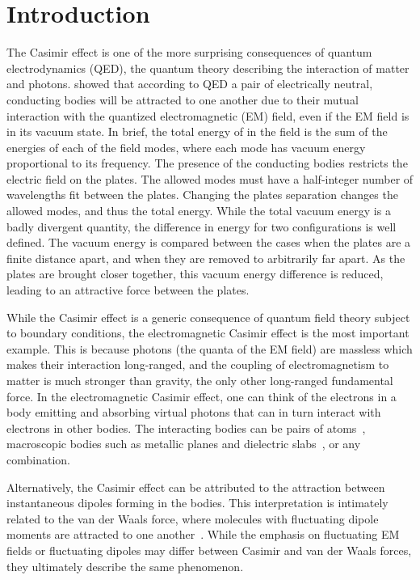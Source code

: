 \chapter{Introduction}
\label{ch:introduction}

The Casimir effect is one of the more surprising consequences of quantum electrodynamics (QED), the quantum theory
describing the interaction of matter and photons.
\citet{Casimir1948} showed that according to QED a pair of  electrically neutral, conducting bodies will be attracted to one another due to their mutual interaction
with the quantized electromagnetic (EM) field, even if the EM field is in its vacuum state.  
In brief, the total energy of in the field is the sum of the energies of each of the field modes, 
where each mode has vacuum energy proportional to its frequency.   
The presence of the conducting bodies restricts the electric field on the plates.
The allowed modes must have a half-integer number of wavelengths fit between the plates.  
Changing the plates separation changes the allowed modes, and thus the total energy. 
While the total vacuum energy is a badly divergent quantity, the difference in energy for two configurations
is well defined.  
The vacuum energy is compared between the cases when the plates are a finite distance apart, and when
they are removed to arbitrarily far apart.  
As the plates are brought closer together, this vacuum energy difference is reduced, leading to an attractive force
between the plates.  

While the Casimir effect is a generic consequence of quantum field theory subject to boundary conditions,
the electromagnetic Casimir effect is the most important example.  
This is because photons (the quanta of the EM field) are massless which makes their interaction long-ranged, 
and the coupling of electromagnetism to matter is much stronger than gravity, the only other long-ranged fundamental force.  
In the electromagnetic Casimir effect, one can think of the electrons in a body emitting and absorbing virtual photons that can in turn
interact with electrons in other bodies. %
The interacting bodies can be pairs of atoms~\citep{CasimirPolder1948}, 
macroscopic bodies such as metallic planes and dielectric slabs~\citep{Lifshitz1956}, or any combination.

Alternatively, the Casimir effect can be attributed to the attraction between instantaneous dipoles forming in the bodies.  
This interpretation is intimately related to the van der Waals force, where 
molecules with fluctuating dipole moments are attracted to one another~\citep{vanderWaals}.
While the emphasis on fluctuating EM fields or fluctuating dipoles may differ between Casimir and van der Waals forces,
they ultimately describe the same phenomenon.%


